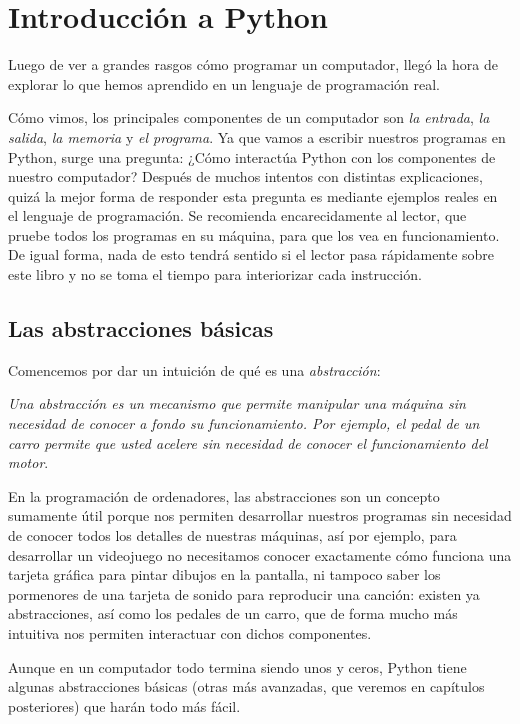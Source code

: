\chapter{Introducción a Python}

Luego de ver a grandes rasgos cómo programar un computador, llegó la hora de explorar lo que hemos aprendido en un lenguaje de programación real. 

Cómo vimos, los principales componentes de un computador son \emph{la entrada}, \emph{la salida}, \emph{la memoria} y \emph{el programa}. Ya que vamos a escribir nuestros programas en Python, surge una pregunta: ¿Cómo interactúa Python con los componentes de nuestro computador? Después de muchos intentos con distintas explicaciones, quizá la mejor forma de responder esta pregunta es mediante ejemplos reales en el lenguaje de programación. Se recomienda encarecidamente al lector, que pruebe todos los programas en su máquina, para que los vea en funcionamiento. De igual forma, nada de esto tendrá sentido si el lector pasa rápidamente sobre este libro y no se toma el tiempo para interiorizar cada instrucción.

\section{Las abstracciones básicas}

Comencemos por dar un intuición de qué es una \emph{abstracción}:

\emph{Una abstracción es un mecanismo que permite manipular una máquina sin necesidad de conocer a fondo su funcionamiento. Por ejemplo, el pedal de un carro permite que usted acelere sin necesidad de conocer el funcionamiento del motor}. 

En la programación de ordenadores, las abstracciones son un concepto sumamente útil porque nos permiten desarrollar nuestros programas sin necesidad de conocer todos los detalles de nuestras máquinas, así por ejemplo, para desarrollar un videojuego no necesitamos conocer exactamente cómo funciona una tarjeta gráfica para pintar dibujos en la pantalla, ni tampoco saber los pormenores de una tarjeta de sonido para reproducir una canción: existen ya abstracciones, así como los pedales de un carro, que de forma mucho más intuitiva nos permiten interactuar con dichos componentes.

Aunque en un computador todo termina siendo unos y ceros, Python tiene algunas abstracciones básicas (otras más avanzadas, que veremos en capítulos posteriores) que harán todo más fácil.


